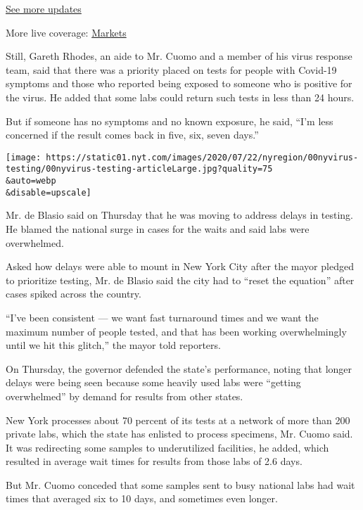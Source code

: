 \href{https://www.nytimes.com/2020/08/07/world/covid-19-news.html?action=click\&pgtype=Article\&state=default\&region=MAIN_CONTENT_1\&context=storylines_live_updates}{See
more updates}

More live coverage:
\href{https://www.nytimes.com/live/2020/08/07/business/stock-market-today-coronavirus?action=click\&pgtype=Article\&state=default\&region=MAIN_CONTENT_1\&context=storylines_live_updates}{Markets}

Still, Gareth Rhodes, an aide to Mr. Cuomo and a member of his virus
response team, said that there was a priority placed on tests for people
with Covid-19 symptoms and those who reported being exposed to someone
who is positive for the virus. He added that some labs could return such
tests in less than 24 hours.

But if someone has no symptoms and no known exposure, he said, ``I'm
less concerned if the result comes back in five, six, seven days.''

\texttt{[image: https://static01.nyt.com/images/2020/07/22/nyregion/00nyvirus-testing/00nyvirus-testing-articleLarge.jpg?quality=75\\\&auto=webp\\\&disable=upscale]}

Mr. de Blasio said on Thursday that he was moving to address delays in
testing. He blamed the national surge in cases for the waits and said
labs were overwhelmed.

Asked how delays were able to mount in New York City after the mayor
pledged to prioritize testing, Mr. de Blasio said the city had to
``reset the equation'' after cases spiked across the country.

``I've been consistent --- we want fast turnaround times and we want the
maximum number of people tested, and that has been working
overwhelmingly until we hit this glitch,'' the mayor told reporters.

On Thursday, the governor defended the state's performance, noting that
longer delays were being seen because some heavily used labs were
``getting overwhelmed'' by demand for results from other states.

New York processes about 70 percent of its tests at a network of more
than 200 private labs, which the state has enlisted to process
specimens, Mr. Cuomo said. It was redirecting some samples to
underutilized facilities, he added, which resulted in average wait times
for results from those labs of 2.6 days.

But Mr. Cuomo conceded that some samples sent to busy national labs had
wait times that averaged six to 10 days, and sometimes even longer.

